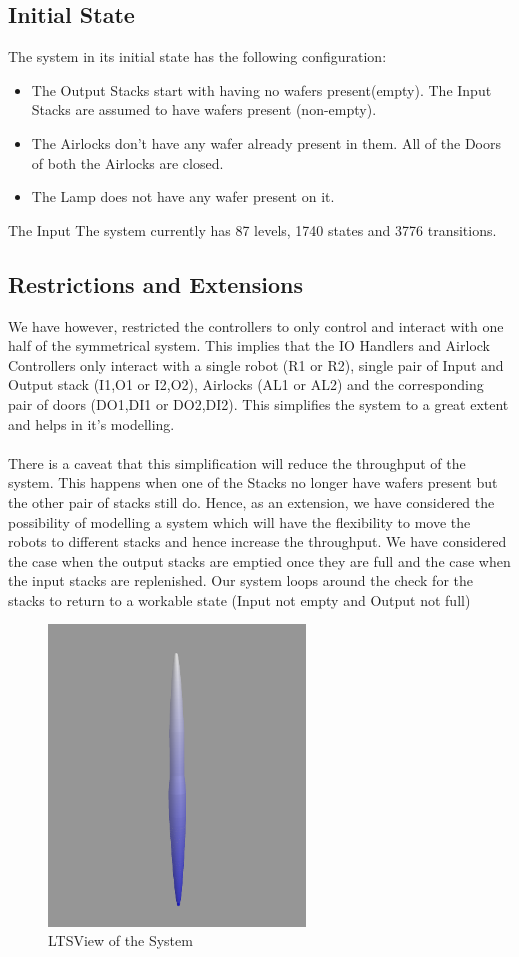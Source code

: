 \documentclass[a4paper,12pt]{article}
\begin{document}
	\subsection{Initial State}
	The system in its initial state has the following configuration:
	\begin{itemize}
		\item The Output Stacks start with having no wafers present(empty). The Input Stacks are assumed to have wafers present (non-empty).
		\item The Airlocks don't have any wafer already present in them. All of the Doors of both the Airlocks are closed.
		\item The Lamp does not have any wafer present on it.
	\end{itemize} 
	The Input The system currently has 87 levels, 1740 states and 3776 transitions.
	\subsection{Restrictions and Extensions}
	We have however, restricted the controllers to only control and interact with one half of the symmetrical system. This implies that the IO Handlers and Airlock Controllers only interact with a single robot (R1 or R2), single pair of Input and Output stack (I1,O1 or I2,O2), Airlocks (AL1 or AL2) and the corresponding pair of doors (DO1,DI1 or DO2,DI2). This simplifies the system to a great extent and helps in it's modelling.
	\\
	\\There is a caveat that this simplification will reduce the throughput of the system. This happens when one of the Stacks no longer have wafers present but the other pair of stacks still do. Hence, as an extension, we have considered the possibility of modelling a system which will have the flexibility to move the robots to different stacks and hence increase the throughput. 
	We have considered the case when the output stacks are emptied once they are full and the case when the input stacks are replenished. Our system loops around the check for the stacks to return to a workable state (Input not empty and Output not full)
	\begin{figure}[ht]
		\centering
		\includegraphics[width=\textwidth, height=8cm]{3D-Model.png}
		\caption{LTSView of the System}
		\label{fig:ltsview}
	\end{figure}
	\newpage
\end{document}
